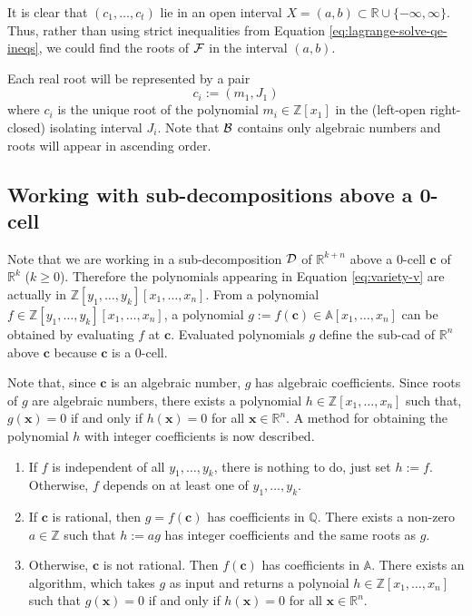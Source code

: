 \documentclass[
]{book}
\theoremstyle{definition}
\theoremstyle{definition}
\theoremstyle{definition}
\theoremstyle{definition}
\theoremstyle{remark}
\begin{document}
It is clear that \((c_1,\ldots,c_t)\) lie in an open interval \(X = (a,b) \subset \mathbb{R}\cup \{ -\infty, \infty \}\). Thus, rather than using strict inequalities from Equation \eqref{eq:lagrange-solve-qe-ineqs}, we could find the roots of \(\cal F\) in the interval \((a,b)\).

Each real root will be represented by a pair
\[
c_i := (m_1,J_1)
\]
where \(c_i\) is the unique root of the polynomial \(m_i \in \mathbb{Z}[x_1]\) in the (left-open right-closed) isolating interval \(J_i\).
Note that \(\cal B\) contains only algebraic numbers and roots will appear in ascending order.

\hypertarget{sec:sub-cad}{%
\subsection{Working with sub-decompositions above a 0-cell}\label{sec:sub-cad}}

Note that we are working in a sub-decomposition \(\cal D\) of \(\mathbb{R}^{k+n}\) above a \(0\)-cell \(\mathbf{c}\) of \(\mathbb{R}^k\) (\(k \ge 0\)). Therefore the polynomials appearing in Equation \eqref{eq:variety-v} are actually in \(\mathbb{Z}[y_1,\ldots,y_k][x_1,\ldots,x_n]\).
From a polynomial \(f \in \mathbb{Z}[y_1,\ldots,y_k][x_1,\ldots,x_n]\), a polynomial \(g := f(\mathbf{c}) \in \mathbb{A}[x_1,\ldots,x_n]\) can be obtained by evaluating \(f\) at \(\mathbf{c}\). Evaluated polynomials \(g\) define the sub-cad of \(\mathbb{R}^n\) above \(\mathbf{c}\) because \(\mathbf{c}\) is a \(0\)-cell.

Note that, since \(\mathbf{c}\) is an algebraic number, \(g\) has algebraic coefficients. Since roots of \(g\) are algebraic numbers, there exists a polynomial \(h \in \mathbb{Z}[x_1,\ldots,x_n]\) such that, \(g(\mathbf{x}) = 0\) if and only if \(h(\mathbf{x}) = 0\) for all \(\mathbf{x} \in \mathbb{R}^n\). A method for obtaining the polynomial \(h\) with integer coefficients is now described.

\begin{enumerate}
\def\labelenumi{\arabic{enumi}.}
\item
  If \(f\) is independent of all \(y_1,\ldots,y_k\), there is nothing to do, just set \(h := f\). Otherwise, \(f\) depends on at least one of \(y_1,\ldots,y_k\).
\item
  If \(\mathbf{c}\) is rational, then \(g = f(\mathbf{c})\) has coefficients in \(\mathbb{Q}\). There exists a non-zero \(a \in \mathbb{Z}\) such that \(h := a g\) has integer coefficients and the same roots as \(g\).
\item
  Otherwise, \(\mathbf{c}\) is not rational. Then \(f(\mathbf{c})\) has coefficients in \(\mathbb{A}\). There exists an algorithm, which takes \(g\) as input and returns a polynoial \(h \in \mathbb{Z}[x_1,\ldots,x_n]\) such that \(g(\mathbf{x}) = 0\) if and only if \(h(\mathbf{x}) = 0\) for all \(\mathbf{x} \in \mathbb{R}^n\).
\end{enumerate}
\end{document}
